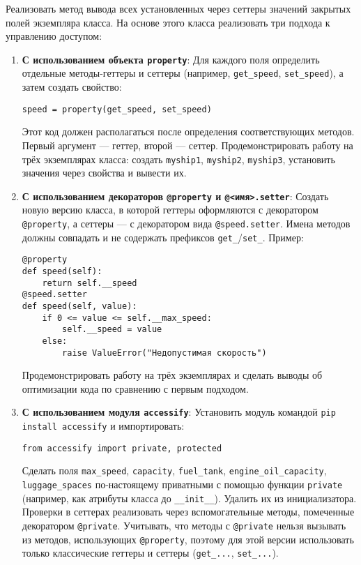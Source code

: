 \begin{enumerate}
\begin{itemize}
\end{itemize}
Реализовать метод вывода всех установленных через сеттеры значений закрытых полей экземпляра класса.
На основе этого класса реализовать три подхода к управлению доступом:
\begin{enumerate}
    \item \textbf{С использованием объекта \texttt{property}}:  
    Для каждого поля определить отдельные методы-геттеры и сеттеры (например, \texttt{get\_speed}, \texttt{set\_speed}), а затем создать свойство:  
    \begin{verbatim}
speed = property(get_speed, set_speed)
    \end{verbatim}  
    Этот код должен располагаться после определения соответствующих методов. Первый аргумент — геттер, второй — сеттер.  
    Продемонстрировать работу на трёх экземплярах класса: создать \texttt{myship1}, \texttt{myship2}, \texttt{myship3}, установить значения через свойства и вывести их.
    \item \textbf{С использованием декораторов \texttt{@property} и \texttt{@<имя>.setter}}:  
    Создать новую версию класса, в которой геттеры оформляются с декоратором \texttt{@property}, а сеттеры — с декоратором вида \texttt{@speed.setter}. Имена методов должны совпадать и не содержать префиксов \texttt{get\_}/\texttt{set\_}.  
    Пример:  
    \begin{verbatim}
@property
def speed(self):
    return self.__speed
@speed.setter
def speed(self, value):
    if 0 <= value <= self.__max_speed:
        self.__speed = value
    else:
        raise ValueError("Недопустимая скорость")
    \end{verbatim}  
    Продемонстрировать работу на трёх экземплярах и сделать выводы об оптимизации кода по сравнению с первым подходом.
    \item \textbf{С использованием модуля \texttt{accessify}}:  
    Установить модуль командой \texttt{pip install accessify} и импортировать:  
    \begin{verbatim}
from accessify import private, protected
    \end{verbatim}  
    Сделать поля \texttt{max\_speed}, \texttt{capacity}, \texttt{fuel\_tank}, \texttt{engine\_oil\_capacity}, \texttt{luggage\_spaces} по-настоящему приватными с помощью функции \texttt{private} (например, как атрибуты класса до \texttt{\_\_init\_\_}). Удалить их из инициализатора.  
    Проверки в сеттерах реализовать через вспомогательные методы, помеченные декоратором \texttt{@private}.  
    Учитывать, что методы с \texttt{@private} нельзя вызывать из методов, использующих \texttt{@property}, поэтому для этой версии использовать только классические геттеры и сеттеры (\texttt{get\_...}, \texttt{set\_...}).  

\end{enumerate}
\end{enumerate}
